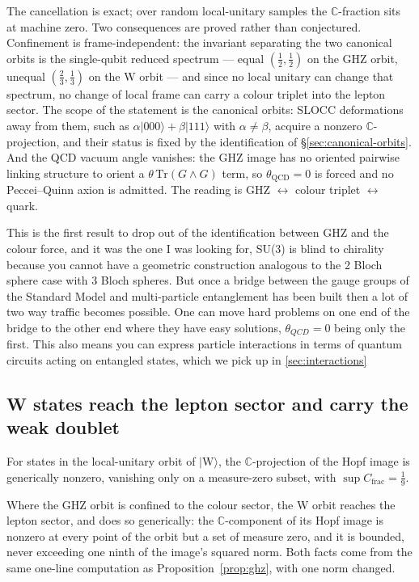 The cancellation is exact; over random local-unitary samples the $\mathbb{C}$-fraction sits at
machine zero. Two consequences are proved rather than conjectured. Confinement is frame-independent:
the invariant separating the two canonical orbits is the single-qubit reduced spectrum --- equal
$(\tfrac12,\tfrac12)$ on the GHZ orbit, unequal $(\tfrac23,\tfrac13)$ on the W orbit --- and since no
local unitary can change that spectrum, no change of local frame can carry a colour triplet into the
lepton sector. The scope of the statement is the canonical orbits: SLOCC deformations away from them,
such as $\alpha\lvert000\rangle+\beta\lvert111\rangle$ with $\alpha\neq\beta$, acquire a nonzero
$\mathbb{C}$-projection, and their status is fixed by the identification of
\S\ref{sec:canonical-orbits}. And the QCD vacuum angle vanishes: the GHZ image has
no oriented pairwise linking structure to orient a $\theta\,\mathrm{Tr}(G\wedge G)$ term, so
$\theta_{\mathrm{QCD}} = 0$ is forced and no Peccei--Quinn axion is admitted. The reading is
GHZ $\leftrightarrow$ colour triplet $\leftrightarrow$ quark.

This is the first result to drop out of the identification between GHZ and the colour force, and it was the one 
I was looking for, SU(3) is blind to chirality because you cannot have a geometric construction analogous to the 
2 Bloch sphere case with 3 Bloch spheres. But once a bridge between the gauge groups of the Standard Model
and multi-particle entanglement has been built then a lot of two way traffic becomes possible. One can move hard problems
on one end of the bridge to the other end where they have easy solutions, $\theta_{QCD}=0$ being only the first. This also means
you can express particle interactions in terms of quantum circuits acting on entangled states, which we pick up in \ref{sec:interactions}

\subsection{W states reach the lepton sector and carry the weak doublet}

\begin{proposition}[W accessibility]\label{prop:w-access}
For states in the local-unitary orbit of $\lvert\mathrm{W}\rangle$, the $\mathbb{C}$-projection of the
Hopf image is generically nonzero, vanishing only on a measure-zero subset, with
$\sup C_{\mathrm{frac}} = \tfrac19$.
\end{proposition}

Where the GHZ orbit is confined to the colour sector, the W orbit reaches the lepton sector, and
does so generically: the $\mathbb{C}$-component of its Hopf image is nonzero at every point of the
orbit but a set of measure zero, and it is bounded, never exceeding one ninth of the image's squared
norm. Both facts come from the same one-line computation as Proposition~\ref{prop:ghz}, with one
norm changed.

